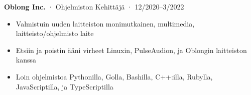 \documentclass[12pt, oneside]{article}
\newcommand{\jobtitle}[3] {
	{\bf #1} · {#2} · {#3} \vspace{-7pt} \\
}
\begin{document}
\begin{flushleft}
\jobtitle{Oblong Inc.}{Ohjelmiston Kehittäjä}{12/2020–3/2022}
\begin{itemize}
	\item Valmistuin uuden laitteiston monimutkainen, multimedia, laitteisto/ohjelmisto laite \\
	\item Etsiin ja poistin ääni virheet Linuxin, PulseAudion, ja Oblongin laitteiston kanssa \\
	\item Loin ohjelmistoa Pythonilla, Golla, Bashilla, C++:illa, Rubylla, JavaScriptilla, ja TypeScriptilla \\
\end{itemize}


\end{flushleft}
\end{document}
